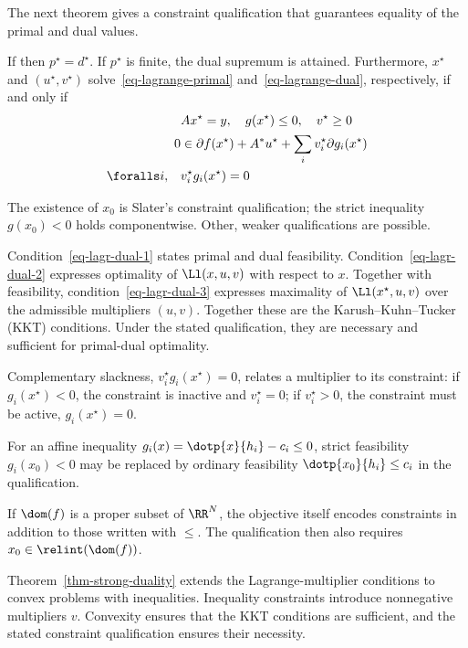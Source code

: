 The next theorem gives a constraint qualification that guarantees equality of the primal and dual values.

\begin{thm}\label{thm-strong-duality}
	If 
	then $p^\star=d^\star$. If $p^\star$ is finite, the dual supremum is attained. Furthermore, $x^\star$ and $(u^\star,v^\star)$ solve~\eqref{eq-lagrange-primal} and~\eqref{eq-lagrange-dual}, respectively, if and only if
	\begin{align}
		\label{eq-lagr-dual-1}  & Ax^\star=y, \quad g(x^\star) \leq 0, \quad v^\star \geq 0 \\
		\label{eq-lagr-dual-2} 0 &\in \partial f(x^\star) + A^*u^\star + \sum_i v_i^\star \partial g_i(x^\star) \\
		\label{eq-lagr-dual-3}  \foralls i, \quad & v_i^\star g_i(x^\star) = 0
	\end{align}
\end{thm}

The existence of $x_0$ is Slater's constraint qualification; the strict inequality $g(x_0)<0$ holds componentwise. Other, weaker qualifications are possible.

Condition~\eqref{eq-lagr-dual-1} states primal and dual feasibility.
%
Condition~\eqref{eq-lagr-dual-2} expresses optimality of $\Ll(x,u,v)$ with respect to $x$.
%
Together with feasibility, condition~\eqref{eq-lagr-dual-3} expresses maximality of $\Ll(x^\star,u,v)$ over the admissible multipliers $(u,v)$.
%
Together these are the Karush--Kuhn--Tucker (KKT) conditions. Under the stated qualification, they are necessary and sufficient for primal-dual optimality.


Complementary slackness, $v_i^\star g_i(x^\star) = 0$, relates a multiplier to its constraint: if $g_i(x^\star)<0$, the constraint is inactive and $v_i^\star=0$; if $v_i^\star>0$, the constraint must be active, $g_i(x^\star)=0$.

For an affine inequality $g_i(x) = \dotp{x}{h_i} - c_i \leq 0$, strict feasibility $g_i(x_0)<0$ may be replaced by ordinary feasibility $\dotp{x_0}{h_i} \leq c_i$ in the qualification.

If $\dom(f)$ is a proper subset of $\RR^N$, the objective itself encodes constraints in addition to those written with $\leq$. The qualification then also requires $x_0 \in \relint(\dom(f))$.
	
Theorem~\ref{thm-strong-duality} extends the Lagrange-multiplier conditions to convex problems with inequalities. Inequality constraints introduce nonnegative multipliers $v$. Convexity ensures that the KKT conditions are sufficient, and the stated constraint qualification ensures their necessity.

